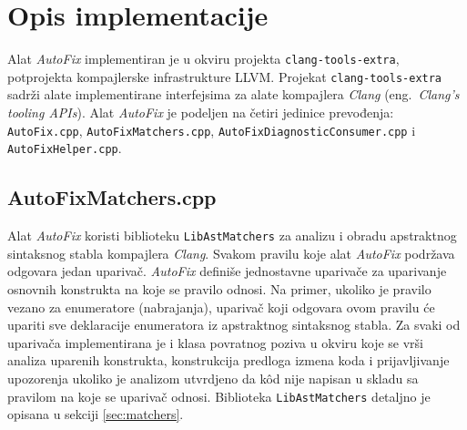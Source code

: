 \documentclass[12pt,oneside]{memoir}
\begin{document}
\section{Opis implementacije}

Alat \textit{AutoFix} implementiran je u okviru projekta \texttt{clang-tools-extra}, potprojekta kompajlerske infrastrukture LLVM. Projekat \texttt{clang-tools-extra} sadr\v{z}i alate implementirane interfejsima za alate kompajlera \textit{Clang} (eng.~\textit{Clang’s tooling APIs}).
Alat \textit{AutoFix} je podeljen na \v{c}etiri jedinice prevođenja: \texttt{AutoFix.cpp}, \texttt{AutoFix\-Matchers.cpp}, \texttt{AutoFixDiagnosticConsumer.cpp} i \texttt{AutoFixHelper.cpp}.

\subsection{AutoFixMatchers.cpp}
Alat \textit{AutoFix} koristi biblioteku \texttt{LibAstMatchers} za analizu i obradu apstraktnog sintaksnog stabla kompajlera \textit{Clang}. Svakom pravilu koje alat \textit{AutoFix} podr\v{z}ava odgovara jedan upariva\v{c}. \textit{AutoFix} defini\v{s}e jednostavne upariva\v{c}e za uparivanje osnovnih konstrukta na koje se pravilo odnosi. Na primer, ukoliko je pravilo vezano za enumeratore (nabrajanja), upariva\v{c} koji odgovara ovom pravilu \'{c}e upariti sve deklaracije enumeratora iz apstraktnog sintaksnog stabla. Za svaki od upariva\v{c}a implementirana je i klasa povratnog poziva u okviru koje se vr\v{s}i analiza uparenih konstrukta, konstrukcija predloga izmena koda i prijavljivanje upozorenja ukoliko je analizom utvrdjeno da k\^{o}d nije napisan u skladu sa pravilom na koje se upariva\v{c} odnosi. Biblioteka \texttt{LibAstMatchers} detaljno je opisana u sekciji \ref{sec:matchers}.
\end{document}
